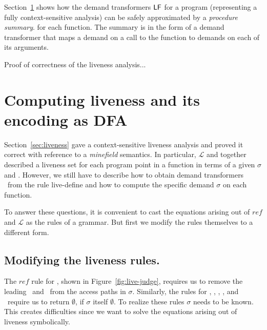\documentclass[9pt]{sigplanconf}
\begin{document}
Section~\ref{sec:computing}   shows   how   the  demand   transformers
$\mathsf{LF}$  for  a  program  (representing  a  fully  context-sensitive
analysis) can be safely approximated by a {\em procedure summary}. for
each function.   The summary  is in the  form of a  demand transformer
that maps a demand on a call to the function to demands on each of its
arguments.  

{\color{red} Proof of correctness of the liveness analysis...}


\section{Computing liveness and its encoding as DFA}\label{sec:computing}
Section~\ref{sec:liveness} gave  a context-sensitive liveness analysis
and  {\color  {red}  proved  it  correct  with  reference  to  a  {\em
    minefield} semantics}.  In  particular, $\mathcal{L}$ and 
together described a liveness set for each program point in a function
in terms of  a given $\sigma$ and \Lfonly.  However,  we still have to
describe how to obtain demand transformers \Lfonly\ from the rule {\sc
  live-define} and how to compute the specific demand $\sigma$ on each
function.

To  answer these  questions, it  is convenient  to cast  the equations
arising out of $\mathit{ref}$  and $\mathcal{L}$ as the rules of a
grammar.   But first  we modify  the rules  themselves to  a different
form.

\subsection{Modifying the liveness rules.}

The      $\mathit{ref}$     rule      for     \CONS,      shown     in
Figure~\ref{fig:live-judge},  requires   us  to  remove   the  leading
\acar\ and \acdr\  from the access paths in  $\sigma$.  Similarly, the
rules for  \CAR, \CDR, \PRIM, \NULLQ,  and \SIF\ require  us to return
$\emptyset$, if  $\sigma$ itself $\emptyset$.  To  realize these rules
$\sigma$ needs to be known. This creates difficulties since we want to
solve the equations arising out of liveness symbolically.
\end{document}
